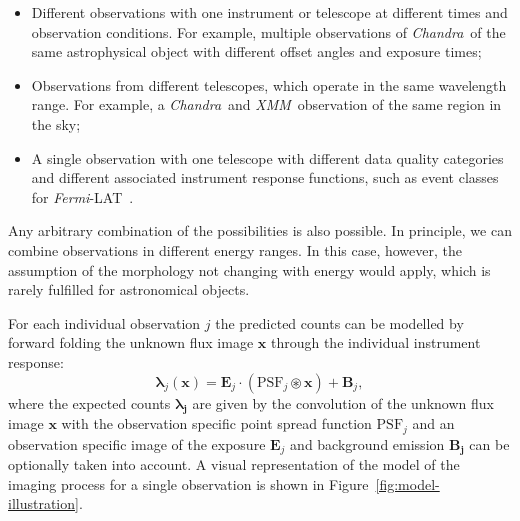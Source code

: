 \documentclass[twocolumn]{aastex631}
\newcommand{\chandra}{\textit{Chandra}~}
\newcommand{\xmm}{\textit{XMM}~}
\newcommand{\fermi}{\textit{Fermi}-LAT~}
\begin{document}
    \begin{itemize}
        \item Different observations with one instrument or telescope at different times and observation conditions. For example, multiple observations of \chandra of the same astrophysical object with different offset angles and exposure times;
        \item Observations from different telescopes, which operate in the same wavelength range. For example, a \chandra and \xmm observation of the same region in the sky;
        \item A single observation with one telescope with different data quality categories and different associated instrument response functions, such as event classes for \fermi.
    \end{itemize}

    Any arbitrary combination of the possibilities is also possible.
    In principle, we can combine observations in different energy ranges. In this case, however, the assumption of the morphology not changing with energy would apply, which is rarely fulfilled for astronomical objects.
    
    For each individual observation $j$ the predicted counts can be modelled by forward folding the unknown flux image $\mathbf{x}$ through the individual instrument response:
    \begin{equation}
        \label{eq:model}
        \boldsymbol{\lambda}_j(\mathbf{x}) = \mathbf{E}_j \cdot \left(\mathrm{PSF}_j \circledast \mathbf{x}\right) + \mathbf{B}_j,
    \end{equation}
    where the expected counts $\boldsymbol{\lambda_j}$ are given by the convolution of the unknown flux image $\mathbf{x}$ with the observation specific point spread function $\mathrm{PSF}_j$ and an observation specific image of the exposure $\mathbf{E}_j$ and background emission $\mathbf{B_j}$ can be optionally taken into account. A visual representation of the model of the imaging process for a single observation is shown in Figure~\ref{fig:model-illustration}.
\end{document}
